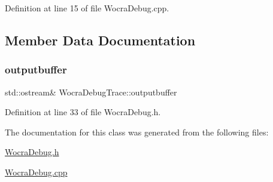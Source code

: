 Definition at line 15 of file Wocra\+Debug.\+cpp.



\subsection{Member Data Documentation}
\hypertarget{classWocraDebugTrace_a948a5a59a058ea25a076da759b621852}{}\label{classWocraDebugTrace_a948a5a59a058ea25a076da759b621852} 
\subsubsection{\texorpdfstring{outputbuffer}{outputbuffer}}
{\footnotesize\ttfamily std\+::ostream\& Wocra\+Debug\+Trace\+::outputbuffer}



Definition at line 33 of file Wocra\+Debug.\+h.



The documentation for this class was generated from the following files\+:\begin{DoxyCompactItemize}
\item 
\hyperlink{WocraDebug_8h}{Wocra\+Debug.\+h}\item 
\hyperlink{WocraDebug_8cpp}{Wocra\+Debug.\+cpp}\end{DoxyCompactItemize}
